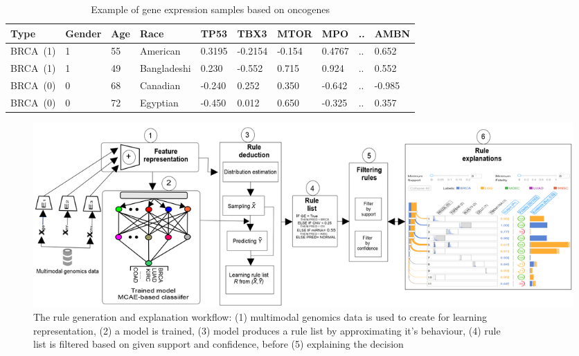 \begin{table}[h!]
    \caption{Example of gene expression samples based on oncogenes}
    \label{ge:ancor_example}
    \vspace{-6mm}
    \begin{center}
        \scriptsize
        \begin{tabular}{l|l|l|l|l|l|l|l|l|l}
            \hline
            \rowcolor{Gray}
            \textbf{Type} & \textbf{Gender} & \textbf{Age} & \textbf{Race} & \textbf{TP53} & \textbf{TBX3} & \textbf{MTOR} & \textbf{MPO}  & .. & \textbf{AMBN} \\\hline    
            BRCA~(1) & 1 & 55 & American & 0.3195 & -0.2154 & -0.154 & 0.4767  & .. & 0.652 \\\hline
            BRCA~(1) & 1 & 49 & Bangladeshi & 0.230 &  -0.552  & 0.715  & 0.924   & .. & 0.552 \\\hline
            BRCA~(0) & 0 & 68 & Canadian & -0.240 &  0.252  & 0.350  & -0.642  & .. & -0.985 \\\hline
            BRCA~(0) & 0 & 72 & Egyptian & -0.450 &  0.012  & 0.650  & -0.325  & .. & 0.357 \\\hline
        \end{tabular}
        \vspace{-4mm}
    \end{center}
\end{table}


\begin{figure}
	\centering
		\includegraphics[scale=0.7]{images/rules_wf.png}
	    \caption[The rule generation and explanation workflow]{The rule generation and explanation workflow: (1) multimodal genomics data is used to create for learning\\ representation, (2) a model is trained, (3) model produces a rule list by approximating it's behaviour, (4) rule\\ list is filtered based on given support and confidence, before (5) explaining the decision} 
	    \label{fig:rules_wf}
\end{figure}

